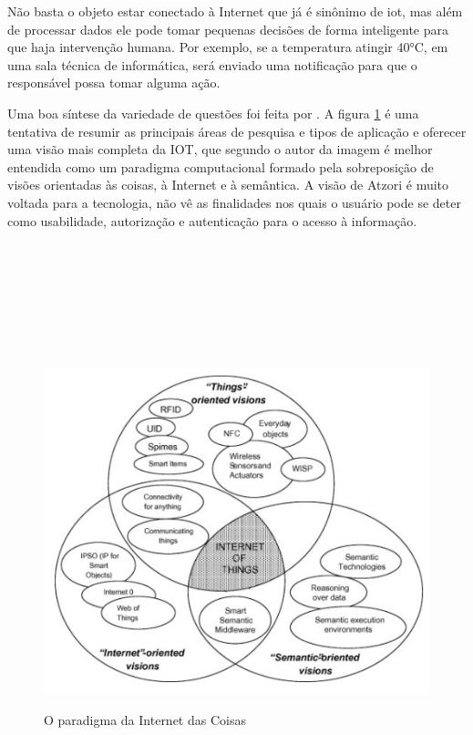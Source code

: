 Não basta o objeto estar conectado à Internet que já é sinônimo de iot, mas além de processar dados ele pode tomar pequenas decisões de forma inteligente para que haja intervenção humana. Por exemplo, se a temperatura atingir 40°C, em uma sala técnica de informática, será enviado uma notificação para que o responsável possa tomar alguma ação. 

Uma boa síntese da variedade de questões foi feita por \cite{atzori2010internet}. A figura \ref{fig:IoTParadigma} é uma tentativa de resumir as principais áreas de pesquisa e tipos de aplicação e oferecer uma visão mais completa da IOT, que segundo o autor da imagem é melhor entendida como um paradigma computacional formado pela sobreposição de visões orientadas às coisas, à Internet e à semântica.
A visão de Atzori é muito voltada para a tecnologia, não vê as finalidades nos quais o usuário pode se deter como usabilidade, autorização e autenticação para o acesso à informação.
\\
\\
\\
\\
\\
\\
\\
\\
\begin{figure} [!h]
    \centering
    \caption{O paradigma da Internet das Coisas}
    \includegraphics[scale = 0.7]{Figuras/Internet_das_Coisas.png}
    \label{fig:IoTParadigma}
\end{figure}


